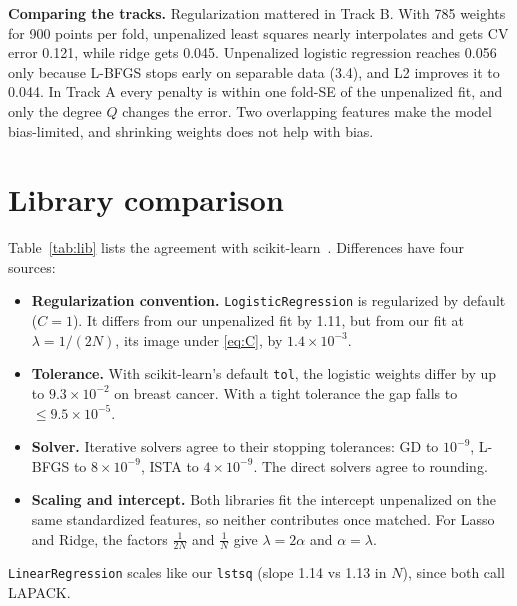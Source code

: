 \documentclass[conference]{IEEEtran}
\begin{document}
\textbf{Comparing the tracks.} Regularization mattered in Track B. With 785 weights for 900 points per fold, unpenalized least squares nearly interpolates and gets CV error 0.121, while ridge gets 0.045. Unpenalized logistic regression reaches 0.056 only because L-BFGS stops early on separable data (3.4), and L2 improves it to 0.044. In Track A every penalty is within one fold-SE of the unpenalized fit, and only the degree $Q$ changes the error. Two overlapping features make the model bias-limited, and shrinking weights does not help with bias.

\section{Library comparison}\label{sec:lib}
Table~\ref{tab:lib} lists the agreement with scikit-learn~\cite{sklearn}. Differences have four sources:
\begin{itemize}
\item \textbf{Regularization convention.} \texttt{LogisticRegression} is regularized by default ($C=1$). It differs from our unpenalized fit by 1.11, but from our fit at $\lambda=1/(2N)$, its image under \eqref{eq:C}, by $1.4\times10^{-3}$.
\item \textbf{Tolerance.} With scikit-learn's default \texttt{tol}, the logistic weights differ by up to $9.3\times10^{-2}$ on breast cancer. With a tight tolerance the gap falls to $\le9.5\times10^{-5}$.
\item \textbf{Solver.} Iterative solvers agree to their stopping tolerances: GD to $10^{-9}$, L-BFGS to $8\times10^{-9}$, ISTA to $4\times10^{-9}$. The direct solvers agree to rounding.
\item \textbf{Scaling and intercept.} Both libraries fit the intercept unpenalized on the same standardized features, so neither contributes once matched. For Lasso and Ridge, the factors $\frac1{2N}$ and $\frac1N$ give $\lambda=2\alpha$ and $\alpha=\lambda$.
\end{itemize}
\texttt{LinearRegression} scales like our \texttt{lstsq} (slope 1.14 vs 1.13 in $N$), since both call LAPACK.
\end{document}

